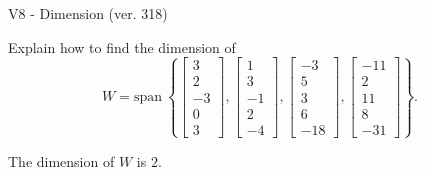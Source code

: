 \begin{exercise}
  \begin{exerciseTitle}V8 - Dimension (ver. 318)\end{exerciseTitle}
  \begin{exerciseStatement}
    Explain how to find the dimension of 
\[W=\mathrm{span}\ \left\{\left[\begin{array}{r}
3 \\
2 \\
-3 \\
0 \\
3
\end{array}\right] , \left[\begin{array}{r}
1 \\
3 \\
-1 \\
2 \\
-4
\end{array}\right] , \left[\begin{array}{r}
-3 \\
5 \\
3 \\
6 \\
-18
\end{array}\right] , \left[\begin{array}{r}
-11 \\
2 \\
11 \\
8 \\
-31
\end{array}\right]\right\}.\]



  \end{exerciseStatement}
  \begin{exerciseAnswer}
   The dimension of \(W\) is  \(2\).
  


  \end{exerciseAnswer}
\end{exercise}